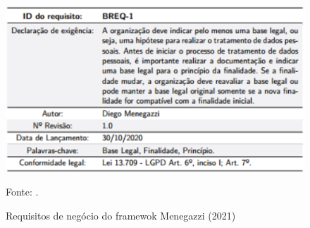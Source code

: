 \documentclass[
	12pt,				%
	openright,			%
	oneside,			%
	a4paper,			%
	english,			%
	french,				%
	spanish,			%
	brazil,				%
	]{abntex2}
\begin{document}
\begin{figure}[ht]
    \centering
    \caption{Requisitos de negócio do framewok Menegazzi (2021)}
    \includegraphics[width=6.5in]{Images/10Menegazzi.png}
    \label{fig: MenegazziFigB}
    
    \centering \small Fonte: \cite{Menegazzi2021}.
\end{figure}
\end{document}
